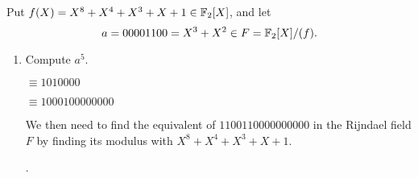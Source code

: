 \begin{problem}
Put $f(X)=X^8+X^4+X^3+X+1 \in \mathbb{F}_2[X]$, and let 
\[ a=00001100=X^3+X^2 \in F=\mathbb{F}_2[X]/(f). \]  
\begin{enumerate}\renewcommand{\itemsep}{3mm}
\item Compute $a^5$.

\begin{Answer}
  
\begin{multicols}{2}

\newline
\color{zaffre}
$\equiv 1010000$
\color{black}

\noindent
{}
\newline
\color{zaffre}
$\equiv 1 0 0 0 1 0 0 0 0 0 0 0 0$
\color{black}

\noindent
{}
\newline
\color{zaffre}
\color{black}
\end{multicols}

\noindent
We then need to find the equivalent of $1 1 0 0 1 1 0 0 0 0 0 0 0 0 0 0$ in the Rijndael field $F$
by finding its modulus with $X^8+X^4+X^3+X+1$.

\bigskip
\noindent
{}.


\end{Answer}
\end{enumerate}
\end{problem}

